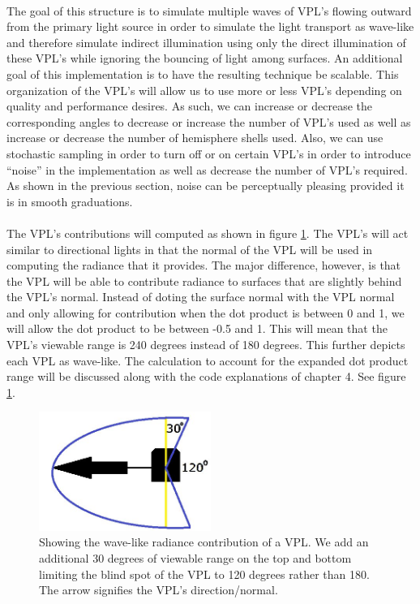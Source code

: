 \paragraph{}
The goal of this structure is to simulate multiple waves of VPL's flowing outward from the primary light source in order to simulate the light transport as wave-like and therefore simulate indirect illumination using only the direct illumination of these VPL's while ignoring the bouncing of light among surfaces.  An additional goal of this implementation is to have the resulting technique be scalable.  This organization of the VPL's will allow us to use more or less VPL's depending on quality and performance desires.  As such, we can increase or decrease the corresponding angles to decrease or increase the number of VPL's used as well as increase or decrease the number of hemisphere shells used.  Also, we can use stochastic sampling in order to turn off or on certain VPL's in order to introduce ``noise'' in the implementation as well as decrease the number of VPL's required.  As shown in the previous section, noise can be perceptually pleasing provided it is in smooth graduations.

\paragraph{}
The VPL's contributions will computed as shown in figure \ref{fig:3.6}.  The VPL's will act similar to directional lights in that the normal of the VPL will be used in computing the radiance that it provides.  The major difference, however, is that the VPL will be able to contribute radiance to surfaces that are slightly behind the VPL's normal.  Instead of doting the surface normal with the VPL normal and only allowing for contribution when the dot product is between 0 and 1, we will allow the dot product to be between -0.5 and 1.  This will mean that the VPL's viewable range is 240 degrees instead of 180 degrees.  This further depicts each VPL as wave-like.  The calculation to account for the expanded dot product range will be discussed along with the code explanations of chapter 4.  See figure \ref{fig:3.6}.

\begin{figure}[h!]
  \centering
    \includegraphics[width=0.5\textwidth]{Figure36.jpg}
  \caption{Showing the wave-like radiance contribution of a VPL. We add an additional 30 degrees of viewable range on the top and bottom limiting the blind spot of the VPL to 120 degrees rather than 180. The arrow signifies the VPL's direction/normal.}
	\label{fig:3.6}
\end{figure}

